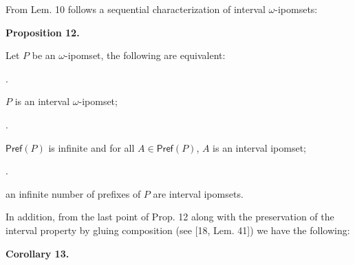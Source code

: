  
 
 
From Lem. 10 follows a sequential characterization of interval $\omega$-ipomsets:\par
 
 
 
\par\medskip\noindent\textbf{Proposition 12.}\par
 
 
Let $P$ be an $\omega$-ipomset, the following are equivalent:\par
  
\par{}. 
 
$P$ is an interval $\omega$-ipomset;\par
 
 
 
\par{}. 
 
$\mathsf{Pref}(P)$ is infinite and for all $A\in\mathsf{Pref}(P)$, $A$ is an interval ipomset;\par
 
 
 
\par{}. 
 
an infinite number of prefixes of $P$ are interval ipomsets.\par
 
 
  
 
 
 
In addition, from the last point of Prop. 12 along with the preservation of the interval property by gluing composition (see [18, Lem. 41]) we have the following:\par
 
 
 
\par\medskip\noindent\textbf{Corollary 13.}\par
 
